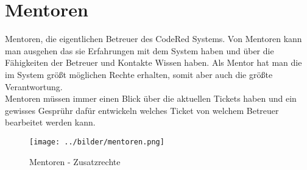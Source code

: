\chapter{Mentoren}  %
\label{chapter:Mentoren}  %

Mentoren, die eigentlichen Betreuer des CodeRed Systems. Von Mentoren kann man ausgehen das sie Erfahrungen mit dem System haben und über die Fähigkeiten der Betreuer und Kontakte Wissen haben. Als Mentor hat man die im System größt möglichen Rechte erhalten, somit aber auch die größte Verantwortung.\\
Mentoren müssen immer einen Blick über die aktuellen Tickets haben und ein gewisses Gesprühr dafür entwickeln welches Ticket von welchem Betreuer bearbeitet werden kann.\\
\vspace{2cm}
\begin{figure}[h]
\begin{center}
   \texttt{[image: ../bilder/mentoren.png]}
   \caption{Mentoren - Zusatzrechte}
   \label{Mentoren - Zusatzrechte}
\end{center}
\end{figure}
